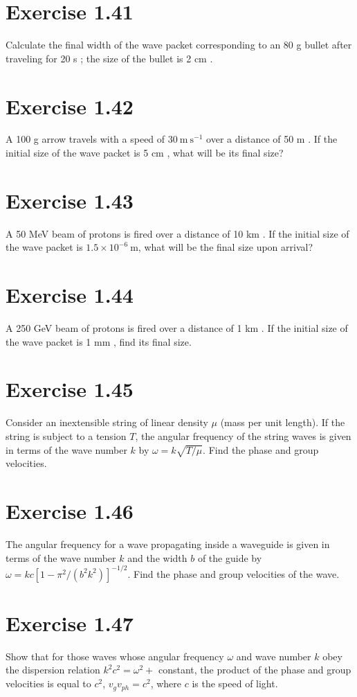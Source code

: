 \documentclass[10pt]{article}
\begin{document}
\section*{Exercise 1.41}
Calculate the final width of the wave packet corresponding to an 80 g bullet after traveling for 20 s ; the size of the bullet is 2 cm .

\section*{Exercise 1.42}
A 100 g arrow travels with a speed of $30 \mathrm{~m} \mathrm{~s}^{-1}$ over a distance of 50 m . If the initial size of the wave packet is 5 cm , what will be its final size?

\section*{Exercise 1.43}
A 50 MeV beam of protons is fired over a distance of 10 km . If the initial size of the wave packet is $1.5 \times 10^{-6} \mathrm{~m}$, what will be the final size upon arrival?

\section*{Exercise 1.44}
A 250 GeV beam of protons is fired over a distance of 1 km . If the initial size of the wave packet is 1 mm , find its final size.

\section*{Exercise 1.45}
Consider an inextensible string of linear density $\mu$ (mass per unit length). If the string is subject to a tension $T$, the angular frequency of the string waves is given in terms of the wave number $k$ by $\omega=k \sqrt{T / \mu}$. Find the phase and group velocities.

\section*{Exercise 1.46}
The angular frequency for a wave propagating inside a waveguide is given in terms of the wave number $k$ and the width $b$ of the guide by $\omega=k c\left[1-\pi^{2} /\left(b^{2} k^{2}\right)\right]^{-1 / 2}$. Find the phase and group velocities of the wave.

\section*{Exercise 1.47}
Show that for those waves whose angular frequency $\omega$ and wave number $k$ obey the dispersion relation $k^{2} c^{2}=\omega^{2}+$ constant, the product of the phase and group velocities is equal to $c^{2}$, $v_{g} v_{p h}=c^{2}$, where $c$ is the speed of light.
\end{document}
